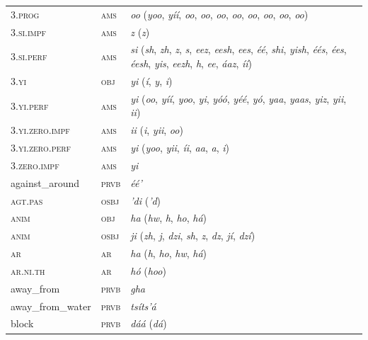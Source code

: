 \begin{xltabular}{\textwidth}{llX}
 3.\textsc{prog} & \textsc{ams} & \textit{oo} (\textit{yoo}, \textit{yíí}, \textit{oo}, \textit{oo}, \textit{oo}, \textit{oo}, \textit{oo}, \textit{oo}, \textit{oo}, \textit{oo})\\
 3.\textsc{si}.\textsc{impf} & \textsc{ams} & \textit{z} (\textit{z})\\
 3.\textsc{si}.\textsc{perf} & \textsc{ams} & \textit{si} (\textit{sh}, \textit{zh}, \textit{z}, \textit{s}, \textit{eez}, \textit{eesh}, \textit{ees}, \textit{éé}, \textit{shi}, \textit{yish}, \textit{éés}, \textit{ées}, \textit{éesh}, \textit{yis}, \textit{eezh}, \textit{h}, \textit{ee}, \textit{áaz}, \textit{íí})\\
 3.\textsc{yi} & \textsc{obj} & \textit{yi} (\textit{í}, \textit{y}, \textit{i})\\
 3.\textsc{yi}.\textsc{perf} & \textsc{ams} & \textit{yi} (\textit{oo}, \textit{yíí}, \textit{yoo}, \textit{yi}, \textit{yóó}, \textit{yéé}, \textit{yó}, \textit{yaa}, \textit{yaas}, \textit{yiz}, \textit{yii}, \textit{ii})\\
 3.\textsc{yi}.\textsc{zero}.\textsc{impf} & \textsc{ams} &\textit{ii} (\textit{i}, \textit{yii}, \textit{oo})\\
 3.\textsc{yi}.\textsc{zero}.\textsc{perf} & \textsc{ams} & \textit{yi} (\textit{yoo}, \textit{yii}, \textit{íi}, \textit{aa}, \textit{a}, \textit{i})\\
 3.\textsc{zero}.\textsc{impf} & \textsc{ams} & \textit{yi}\\
 against\_around & \textsc{prvb} & \textit{éé’}\\                   
 \textsc{agt}.\textsc{pas} & \textsc{osbj} & \textit{’di} (\textit{’d})\\
 \textsc{anim} & \textsc{obj} & \textit{ha} (\textit{hw}, \textit{h}, \textit{ho}, \textit{há})\\
 \textsc{anim} & \textsc{osbj} & \textit{ji} (\textit{zh}, \textit{j}, \textit{dzi}, \textit{sh}, \textit{z}, \textit{dz}, \textit{jí}, \textit{dzí})\\
 \textsc{ar} & \textsc{ar} & \textit{ha} (\textit{h}, \textit{ho}, \textit{hw}, \textit{há})\\
 \textsc{ar}.\textsc{ni}.\textsc{th} & \textsc{ar} & \textit{hó} (\textit{hoo})\\
 away\_from & \textsc{prvb} & \textit{gha}\\                       
 away\_from\_water & \textsc{prvb} & \textit{tsíts’á}\\                   
 block & \textsc{prvb} & \textit{dáá} (\textit{dá})\\

\end{xltabular}
